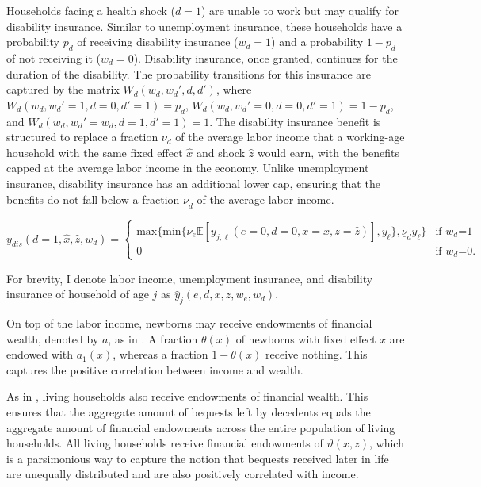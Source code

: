 \documentclass[parskip=full]{article}
\begin{document}
Households facing a health shock ($d=1$) are unable to work but may qualify for disability insurance. Similar to unemployment insurance, these households have a probability $p_{d}$ of receiving disability insurance ($w_{d}=1$) and a probability $1-p_{d}$ of not receiving it ($w_{d}=0$). Disability insurance, once granted, continues for the duration of the disability. The probability transitions for this insurance are captured by the matrix $W_{d}(w_{d},w_{d}',d,d')$, where $W_{d}(w_{d},w_{d}'=1,d=0,d'=1)=p_{d}$, $W_{d}(w_{d},w_{d}'=0,d=0,d'=1)=1-p_{d}$, and $W_{d}(w_{d},w_{d}'=w_{d},d=1,d'=1)=1$. The disability insurance benefit is structured to replace a fraction $\nu_{d}$ of the average labor income that a working-age household with the same fixed effect $\hat{x}$ and shock $\hat{z}$ would earn, with the benefits capped at the average labor income in the economy. Unlike unemployment insurance, disability insurance has an additional lower cap, ensuring that the benefits do not fall below a fraction $\underline{\nu}_{d}$ of the average labor income.

\begin{equation}
y_{dis}(d=1,\hat{x},\hat{z},w_{d}) = \begin{cases}
\mbox{max}\{\mbox{min}\{\nu_{e} \mathbb{E}[y_{j,\ell}(e=0,d=0,x=\hat{x},z=\hat{z})],\overline{y}_{\ell}\},\underline{\nu}_{d}\overline{y}_{\ell}\} &\text{if $w_{d}$=1} \\
0 &\text{if $w_{d}$=0}.
\end{cases}
\end{equation}

\noindent For brevity, I denote labor income, unemployment insurance, and disability insurance of household of age $j$ as $\hat{y}_{j}(e,d,x,z,w_{e},w_{d})$.

On top of the labor income, newborns may receive endowments of financial wealth, denoted by $a$, as in \cite{kaplan2014model}. A fraction $\theta(x)$ of newborns with fixed effect $x$ are endowed with $a_1(x)$, whereas a fraction $1-\theta(x)$ receive nothing. This captures the positive correlation between income and wealth.

As in \citet{kkk-2021}, living households also receive endowments of financial wealth. This ensures that the aggregate amount of bequests left by decedents equals the aggregate amount of financial endowments across the entire population of living households. All living households receive financial endowments of $\vartheta (x,z)$, which is a parsimonious way to capture the notion that bequests received later in life are unequally distributed and are also positively correlated with income.
\end{document}
